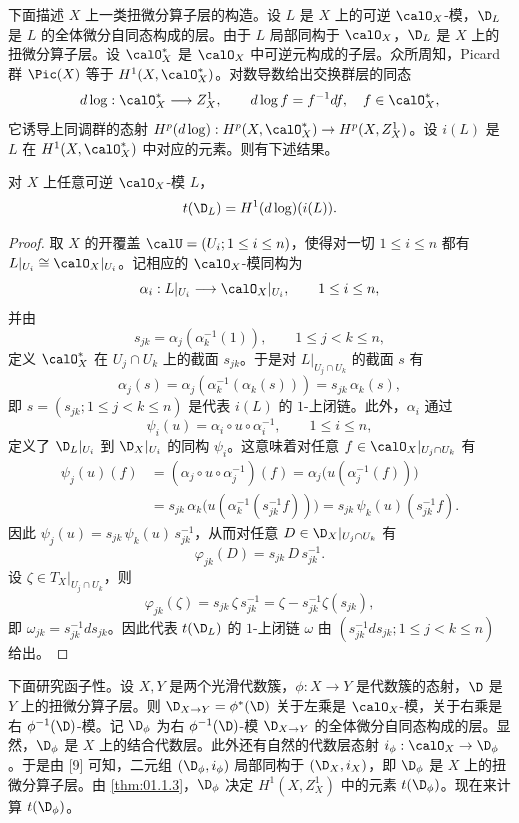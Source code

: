下面描述 $X$ 上一类扭微分算子层的构造。设 $L$ 是 $X$ 上的可逆 $\calO_X$-模，$\D_L$ 是 $L$ 的全体微分自同态构成的层。由于 $L$ 局部同构于 $\calO_X$，$\D_L$ 是 $X$ 上的扭微分算子层。设 $\calO_X^*$ 是 $\calO_X$ 中可逆元构成的子层。众所周知，Picard 群 $\Pic(X)$ 等于 $H^1(X,\calO_X^*)$。对数导数给出交换群层的同态
$$d\log:\calO_X^*\longrightarrow Z^1_X,\qquad d\log f=f^{-1}df,\quad f\in\calO_X^*,$$
它诱导上同调群的态射 $H^p(d\log):H^p(X,\calO_X^*)\to H^p(X,Z^1_X)$。设 $i(L)$ 是 $L$ 在 $H^1(X,\calO_X^*)$ 中对应的元素。则有下述结果。

\begin{proposition}\label{prop:01.1.4}
对 $X$ 上任意可逆 $\calO_X$-模 $L$，
$$t(\D_L)=H^1(d\log)(i(L)).$$
\end{proposition}

\begin{proof}
取 $X$ 的开覆盖 $\calU=(U_i;1\le i\le n)$，使得对一切 $1\le i\le n$ 都有 $L|_{U_i}\cong\calO_X|_{U_i}$。记相应的 $\calO_X$-模同构为
$$\alpha_i:L|_{U_i}\longrightarrow\calO_X|_{U_i},\qquad 1\le i\le n,$$
并由
$$s_{jk}=\alpha_j(\alpha_k^{-1}(1)),\qquad 1\le j<k\le n,$$
定义 $\calO_X^*$ 在 $U_j\cap U_k$ 上的截面 $s_{jk}$。于是对 $L|_{U_j\cap U_k}$ 的截面 $s$ 有
$$\alpha_j(s)=\alpha_j(\alpha_k^{-1}(\alpha_k(s)))=s_{jk}\,\alpha_k(s),$$
即 $s=(s_{jk};1\le j<k\le n)$ 是代表 $i(L)$ 的 $1$-上闭链。此外，$\alpha_i$ 通过
$$\psi_i(u)=\alpha_i\circ u\circ\alpha_i^{-1},\qquad 1\le i\le n,$$
定义了 $\D_L|_{U_i}$ 到 $\D_X|_{U_i}$ 的同构 $\psi_i$。这意味着对任意 $f\in\calO_X|_{U_j\cap U_k}$ 有
\begin{align*}
\psi_j(u)(f)&=(\alpha_j\circ u\circ\alpha_j^{-1})(f)=\alpha_j\bigl(u(\alpha_j^{-1}(f))\bigr)\\
&=s_{jk}\,\alpha_k\bigl(u(\alpha_k^{-1}(s_{jk}^{-1}f))\bigr)=s_{jk}\,\psi_k(u)(s_{jk}^{-1}f).
\end{align*}
因此 $\psi_j(u)=s_{jk}\,\psi_k(u)\,s_{jk}^{-1}$，从而对任意 $D\in\D_X|_{U_j\cap U_k}$ 有
$$\varphi_{jk}(D)=s_{jk}\,D\,s_{jk}^{-1}.$$
设 $\zeta\in T_X|_{U_j\cap U_k}$，则
$$\varphi_{jk}(\zeta)=s_{jk}\,\zeta\,s_{jk}^{-1}=\zeta-s_{jk}^{-1}\zeta(s_{jk}),$$
即 $\omega_{jk}=s_{jk}^{-1}ds_{jk}$。因此代表 $t(\D_L)$ 的 $1$-上闭链 $\omega$ 由 $(s_{jk}^{-1}ds_{jk};1\le j<k\le n)$ 给出。
\end{proof}

下面研究函子性。设 $X,Y$ 是两个光滑代数簇，$\phi:X\to Y$ 是代数簇的态射，$\D$ 是 $Y$ 上的扭微分算子层。则 $\D_{X\to Y}=\phi^*(\D)$ 关于左乘是 $\calO_X$-模，关于右乘是右 $\phi^{-1}(\D)$-模。记 $\D_\phi$ 为右 $\phi^{-1}(\D)$-模 $\D_{X\to Y}$ 的全体微分自同态构成的层。显然，$\D_\phi$ 是 $X$ 上的结合代数层。此外还有自然的代数层态射 $i_\phi:\calO_X\to\D_\phi$。于是由 [9] 可知，二元组 $(\D_\phi,i_\phi)$ 局部同构于 $(\D_X,i_X)$，即 $\D_\phi$ 是 $X$ 上的扭微分算子层。由 \ref{thm:01.1.3}，$\D_\phi$ 决定 $H^1(X,Z^1_X)$ 中的元素 $t(\D_\phi)$。现在来计算 $t(\D_\phi)$。

